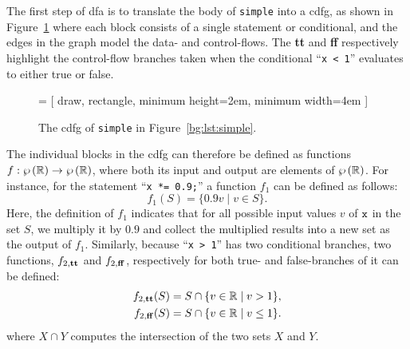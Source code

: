 The first step of \gls{dfa} is to translate the body of \verb|simple| into a
\gls{cdfg}, as shown in Figure~\ref{bg:fig:cdfg} where each block consists of
a single statement or conditional, and the edges in the graph model the data-
and control-flows.  The \textbf{tt} and \textbf{ff} respectively highlight the
control-flow branches taken when the conditional \mbox{``\texttt{x < 1}''}
evaluates to either true or false.
\begin{figure}[ht]
    \centering
     = [
        draw, rectangle, minimum height=2em, minimum width=4em
    ]
    \caption{%
        The \gls{cdfg} of \texttt{simple} in Figure~\ref{bg:lst:simple}.
    }\label{bg:fig:cdfg}
\end{figure}

The individual blocks in the \gls{cdfg} can therefore be defined as functions
$f: \wp\left({\mathbb{R}}\right) \to \wp\left({\mathbb{R}}\right)$, where both its input and
output are elements of $\wp\left({\mathbb{R}}\right)$.  For instance, for the statement
``\lstinline[basicstyle=\tt]{x *= 0.9;}'' a function $f_1$ can be defined as
follows:
\begin{equation}
    f_1(S) = \{ 0.9 v \mid v \in S \}.
\end{equation}
Here, the definition of $f_1$ indicates that for all possible input values $v$
of $\texttt{x}$ in the set $S$, we multiply it by $0.9$ and collect the multiplied
results into a new set as the output of $f_1$.  Similarly, because ``\texttt{x
> 1}'' has two conditional branches, two functions, $f_{2,\mathbf{tt}}$ and $f_{2,
\mathbf{ff}}$, respectively for both true- and false-branches of it can be
defined:
\begin{equation}
    \begin{aligned}
        f_{2, \mathbf{tt}}(S) &= S \cap \{ v \in \mathbb{R} \mid v > 1 \}, \\
        f_{2, \mathbf{ff}}(S) &= S \cap \{ v \in \mathbb{R} \mid v \leq 1 \}.
    \end{aligned}
\end{equation}
where $X \cap Y$ computes the intersection of the two sets $X$ and $Y$.

